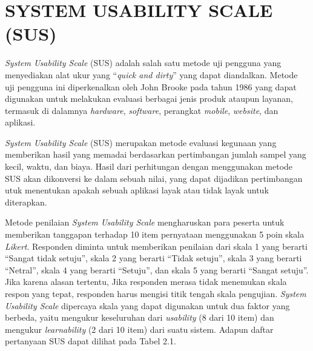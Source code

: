 \section{\uppercase{System Usability Scale (SUS)}}
\textit{System Usability Scale} (SUS) adalah salah satu metode uji pengguna yang menyediakan alat ukur yang “\textit{quick and dirty}” yang dapat diandalkan. Metode uji pengguna ini diperkenalkan oleh John Brooke pada tahun 1986 \citep{thomas2015use} yang dapat digunakan untuk melakukan evaluasi berbagai jenis produk ataupun layanan, termasuk di dalamnya \textit{hardware}, \textit{software}, perangkat \textit{mobile}, \textit{website}, dan aplikasi.

\textit{System Usability Scale} (SUS) merupakan metode evaluasi kegunaan yang memberikan hasil yang memadai berdasarkan pertimbangan 
jumlah sampel yang kecil, waktu, dan biaya. Hasil dari perhitungan dengan menggunakan metode SUS akan dikonversi ke dalam sebuah 
nilai, yang dapat dijadikan pertimbangan utuk menentukan apakah sebuah aplikasi layak atau tidak layak untuk diterapkan. \citep{pudjoatmodjo2016tes}

\par Metode penilaian \textit{System Usability Scale} mengharuskan para peserta untuk memberikan tanggapan terhadap 10 item pernyataan menggunakan 5 poin skala \textit{Likert}. Responden diminta untuk memberikan penilaian dari skala 1 yang berarti “Sangat tidak setuju”, skala 2 yang berarti “Tidak setuju”, skala 3 yang berarti “Netral”, skala 4 yang berarti “Setuju”, dan skala 5 yang berarti “Sangat setuju”. Jika karena alasan tertentu, Jika responden merasa tidak menemukan skala respon yang tepat, responden harus mengisi titik tengah skala pengujian. \textit{System Usability Scale} dipercaya skala yang dapat digunakan untuk dua faktor yang berbeda, yaitu mengukur keseluruhan dari \textit{usability} (8 dari 10 item) dan mengukur \textit{learnability} 
(2 dari 10 item) dari suatu sistem. Adapun daftar pertanyaan SUS dapat dilihat pada Tabel 2.1.

